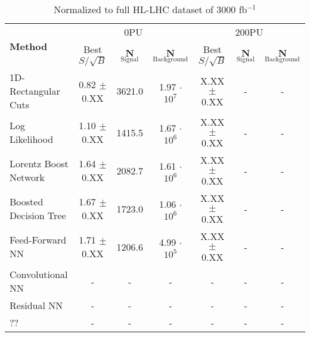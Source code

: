 \documentclass{article}
\begin{document}
\begin{table}[h!]
  \hskip-4.0cm
    \begin{tabular}{|l|c|c|c|c|c|c|} %
      \hline\hline
      \multirow{2}{*}{\textbf{Method}} & \multicolumn{3}{c|}{0PU} & \multicolumn{3}{c|}{200PU}\\
      \cline{2-7}
      & Best $S/\sqrt{B}$ & \textbf{N$_{\mathrm{Signal}}$} & \textbf{N$_{\mathrm{Background}}$} & Best $S/\sqrt{B}$ & \textbf{N$_{\mathrm{Signal}}$} & \textbf{N$_{\mathrm{Background}}$}\\
      \hline
      1D-Rectangular Cuts   & 0.82 $\pm$ 0.XX & 3621.0 & 1.97 $\cdot$ $10^7$ & X.XX $\pm$ 0.XX & - & -\\
      Log Likelihood        & 1.10 $\pm$ 0.XX & 1415.5 & 1.67 $\cdot$ $10^6$ & X.XX $\pm$ 0.XX & - & - \\
      Lorentz Boost Network & 1.64 $\pm$ 0.XX & 2082.7 & 1.61 $\cdot$ $10^6$ & X.XX $\pm$ 0.XX & - & - \\
      Boosted Decision Tree & 1.67 $\pm$ 0.XX & 1723.0 & 1.06 $\cdot$ $10^6$ & X.XX $\pm$ 0.XX & - & - \\
      Feed-Forward NN       & 1.71 $\pm$ 0.XX & 1206.6 & 4.99 $\cdot$ $10^5$ & X.XX $\pm$ 0.XX & - & - \\
      Convolutional NN & - & - & - & - & - & - \\                          

      Residual NN & - & - & - & - & - & - \\
      ?? & - & - & - & - & - & - \\
      \hline\hline
    \end{tabular}
    \caption{Normalized to full HL-LHC dataset of 3000 fb$^{-1}$}
\end{table}
\end{document}
